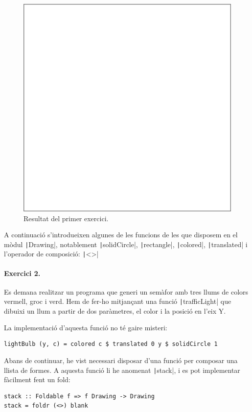 \documentclass[catalan, a4paper]{scrartcl}
\begin{document}
\begin{figure}
\centering
\includegraphics[width=0.5\columnwidth]{../p2/ex1.pdf}
\caption{\label{fig:ex1} Resultat del primer exercici.}
\end{figure}

\clearpage

A continuació s'introdueixen algunes de les funcions de les que disposem
en el mòdul \texttt|Drawing|, notablement
\texttt|solidCircle|, \texttt|rectangle|,
\texttt|colored|, \texttt|translated| i
l'operador de composició: \texttt|<>|

\paragraph{Exercici 2.}

Es demana realitzar un programa que generi un semàfor amb tres llums
de colors vermell, groc i verd. Hem de fer-ho mitjançant una funció
\texttt|trafficLight| que dibuixi un llum a partir de 
dos paràmetres, el color i la posició en l'eix Y.

La implementació d'aquesta funció no té gaire misteri:

\begin{verbatim}
lightBulb (y, c) = colored c $ translated 0 y $ solidCircle 1
\end{verbatim}

Abans de continuar, he vist necessari disposar d'una funció per composar
una llista de formes. A aquesta funció li he anomenat
\texttt|stack|, i es pot implementar fàcilment fent un fold:

\begin{verbatim}
stack :: Foldable f => f Drawing -> Drawing
stack = foldr (<>) blank
\end{verbatim}
\end{document}
